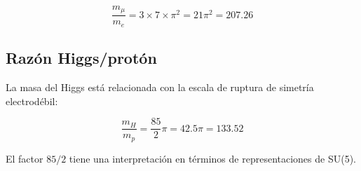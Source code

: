 \documentclass[12pt,a4paper,openany]{book}
\begin{document}
\begin{nivelmatematico}
\begin{equation}
    \frac{m_\mu}{m_e} = 3 \times 7 \times \pi^2 = 21\pi^2 = 207.26
\end{equation}

\subsection*{Razón Higgs/protón}

La masa del Higgs está relacionada con la escala de ruptura de simetría electrodébil:

\begin{equation}
    \frac{m_H}{m_p} = \frac{85}{2}\pi = 42.5\pi = 133.52
\end{equation}

El factor $85/2$ tiene una interpretación en términos de representaciones de SU(5).

\end{nivelmatematico}
\end{document}
